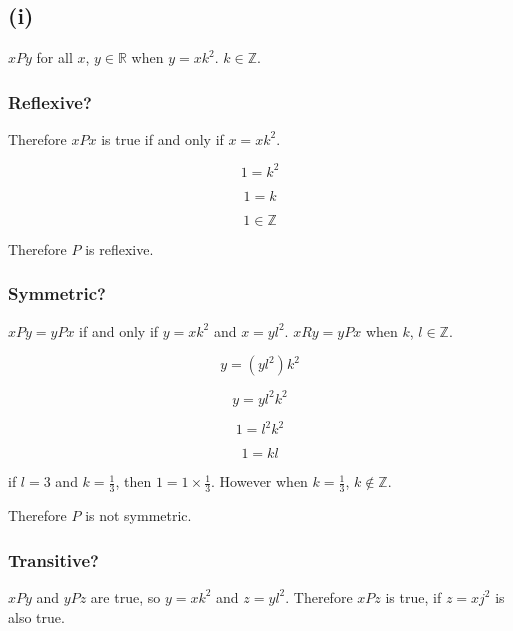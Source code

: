 \documentclass[a4paper,12pt]{article}
\begin{document}
\section{}

\subsection*{(i)}

\noindent $xPy$ for all $x$, $y \in \mathbb{R}$ when $y = xk^{2}$. $k \in \mathbb{Z}$.

\subsubsection*{Reflexive?}

\noindent Therefore $xPx$ is true if and only if $x = xk^{2}$.

\vspace{10mm}

 \[1 = k^{2} \]

\[ 1 = k \]

\[ 1 \in \mathbb{Z} \]

\vspace{10mm}

\noindent Therefore $P$ is reflexive.

\subsubsection*{Symmetric?}

\noindent $xPy = yPx$ if and only if $y = xk^{2}$ and $x = yl^{2}$.
$xRy = yPx$ when $k$, $l \in \mathbb{Z}$.

\[ y = (yl^{2})k^{2} \]

\[ y = y l^{2} k^{2} \]

\[ 1 = l^{2} k^{2} \]

\[ 1 = k l \]

\noindent if $l = 3$ and $k = \frac{1}{3}$, then $1 = 1 \times
\frac{1}{3}$. However when $k = \frac{1}{3}$, $k \not\in \mathbb{Z}$.

\noindent Therefore $P$ is not symmetric.

\subsubsection*{Transitive?}

$xPy$ and $yPz$ are true, so $y = xk^{2}$ and $z = yl^{2}$. Therefore
$xPz$ is true, if $z = xj^{2}$ is also true.
\end{document}
